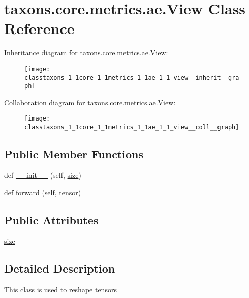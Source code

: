 \hypertarget{classtaxons_1_1core_1_1metrics_1_1ae_1_1_view}{}\section{taxons.\+core.\+metrics.\+ae.\+View Class Reference}
\label{classtaxons_1_1core_1_1metrics_1_1ae_1_1_view}


Inheritance diagram for taxons.\+core.\+metrics.\+ae.\+View\+:
\nopagebreak
\begin{figure}[H]
\begin{center}
\leavevmode
\texttt{[image: classtaxons\_1\_1core\_1\_1metrics\_1\_1ae\_1\_1\_view\_\_inherit\_\_graph]}
\end{center}
\end{figure}


Collaboration diagram for taxons.\+core.\+metrics.\+ae.\+View\+:
\nopagebreak
\begin{figure}[H]
\begin{center}
\leavevmode
\texttt{[image: classtaxons\_1\_1core\_1\_1metrics\_1\_1ae\_1\_1\_view\_\_coll\_\_graph]}
\end{center}
\end{figure}
\subsection*{Public Member Functions}
\begin{DoxyCompactItemize}
\item 
def \hyperlink{classtaxons_1_1core_1_1metrics_1_1ae_1_1_view_a3f7738c3f968835302a2b0e96596a10f}{\+\_\+\+\_\+init\+\_\+\+\_\+} (self, \hyperlink{classtaxons_1_1core_1_1metrics_1_1ae_1_1_view_a784e56422a9ccd2a88afce7d3ca2b42e}{size})
\item 
def \hyperlink{classtaxons_1_1core_1_1metrics_1_1ae_1_1_view_af80cb86d98cd801ede595944c181f36a}{forward} (self, tensor)
\end{DoxyCompactItemize}
\subsection*{Public Attributes}
\begin{DoxyCompactItemize}
\item 
\hyperlink{classtaxons_1_1core_1_1metrics_1_1ae_1_1_view_a784e56422a9ccd2a88afce7d3ca2b42e}{size}
\end{DoxyCompactItemize}


\subsection{Detailed Description}
\begin{DoxyVerb}This class is used to reshape tensors
\end{DoxyVerb}
 

